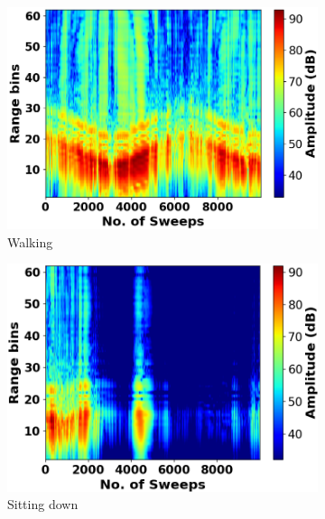 \documentclass{l4proj}
\begin{document}
\begin{figure}[h]
   \centering
   \begin{subfigure}[b]{0.32\textwidth}
        \includegraphics[width=\textwidth]{images/Range-Sweep_1.png}
        \caption{Walking}
        \label{fig:range-sweep1}
    \end{subfigure}
    \hfill
    \begin{subfigure}[b]{0.32\textwidth}
        \includegraphics[width=\textwidth]{images/Range-Sweep_2.png}
        \caption{Sitting down}
        \label{fig:range-sweep2}
    \end{subfigure}
    \hfill
    \begin{subfigure}[b]{0.32\textwidth}

\end{subfigure}
\end{figure}
\end{document}
